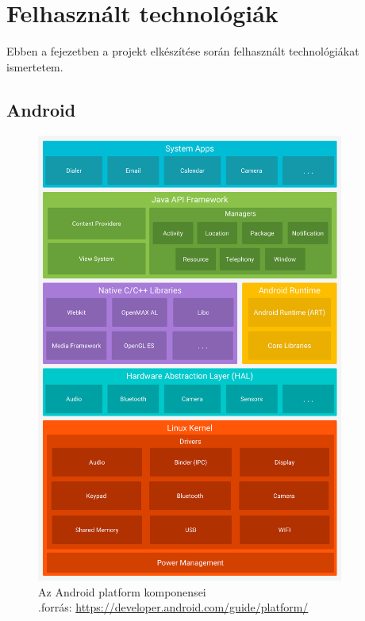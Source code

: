 
\chapter{Felhasznált technológiák}

\begin{osszefoglal}
	Ebben a fejezetben a projekt elkészítése során felhasznált technológiákat ismertetem.
	
\end{osszefoglal}

\section{Android}

\begin{figure}
	\centering
	\setlength{\abovecaptionskip}{0pt}
	\setlength{\belowcaptionskip}{0pt}
	\includegraphics[width=0.9\textwidth, scale=0.9]{images/android}
	 \caption[]%
	{Az Android platform komponensei\\
		{\white .}\hfill{forrás: }\url{https://developer.android.com/guide/platform/}}
\end{figure}

